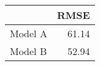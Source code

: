 
\begin{tabular}{l|r}
\hline
  & RMSE\\
\hline
Model A & 61.14\\
\hline
Model B & 52.94\\
\hline
\end{tabular}